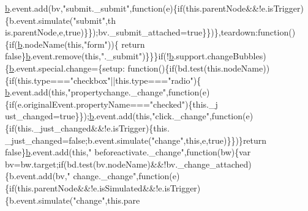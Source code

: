 \begin{DoxyCode}
      \hyperlink{docs_2_programmer's_manual_2html_2jquery_8js_aa4026ad5544b958e54ce5e106fa1c805}{b}.event.add(bv,\textcolor{stringliteral}{"submit.\_submit"},\textcolor{keyword}{function}(e)\{\textcolor{keywordflow}{if}(this.parentNode&&!e.isTrigger)\{b.event.simulate(\textcolor{stringliteral}{"submit"},th
      is.parentNode,e,true)\}\});bv.\_submit\_attached=\textcolor{keyword}{true}\}\})\},teardown:\textcolor{keyword}{function}()\{\textcolor{keywordflow}{if}(\hyperlink{docs_2_programmer's_manual_2html_2jquery_8js_aa4026ad5544b958e54ce5e106fa1c805}{b}.nodeName(\textcolor{keyword}{this},\textcolor{stringliteral}{"form"}))\{\textcolor{keywordflow}{
      return} \textcolor{keyword}{false}\}\hyperlink{docs_2_programmer's_manual_2html_2jquery_8js_aa4026ad5544b958e54ce5e106fa1c805}{b}.event.remove(\textcolor{keyword}{this},\textcolor{stringliteral}{".\_submit"})\}\}\}\textcolor{keywordflow}{if}(!\hyperlink{docs_2_programmer's_manual_2html_2jquery_8js_aa4026ad5544b958e54ce5e106fa1c805}{b}.support.changeBubbles)\{\hyperlink{docs_2_programmer's_manual_2html_2jquery_8js_aa4026ad5544b958e54ce5e106fa1c805}{b}.event.special.change=\{setup:\textcolor{keyword}{
      function}()\{\textcolor{keywordflow}{if}(bd.test(\textcolor{keyword}{this}.nodeName))\{\textcolor{keywordflow}{if}(this.type===\textcolor{stringliteral}{"checkbox"}||this.type===\textcolor{stringliteral}{"radio"})\{
      \hyperlink{docs_2_programmer's_manual_2html_2jquery_8js_aa4026ad5544b958e54ce5e106fa1c805}{b}.event.add(\textcolor{keyword}{this},\textcolor{stringliteral}{"propertychange.\_change"},\textcolor{keyword}{function}(e)\{\textcolor{keywordflow}{if}(e.originalEvent.propertyName===\textcolor{stringliteral}{"checked"})\{this.\_j
      ust\_changed=true\}\});\hyperlink{docs_2_programmer's_manual_2html_2jquery_8js_aa4026ad5544b958e54ce5e106fa1c805}{b}.event.add(\textcolor{keyword}{this},\textcolor{stringliteral}{"click.\_change"},\textcolor{keyword}{function}(e)\{\textcolor{keywordflow}{if}(this.\_just\_changed&&!e.isTrigger)\{this.
      \_just\_changed=false;b.event.simulate(\textcolor{stringliteral}{"change"},this,e,true)\}\})\}\textcolor{keywordflow}{return} \textcolor{keyword}{false}\}\hyperlink{docs_2_programmer's_manual_2html_2jquery_8js_aa4026ad5544b958e54ce5e106fa1c805}{b}.event.add(\textcolor{keyword}{this},\textcolor{stringliteral}{"
      beforeactivate.\_change"},\textcolor{keyword}{function}(bw)\{var bv=bw.target;if(bd.test(bv.nodeName)&&!bv.\_change\_attached)\{b.event.add(bv,\textcolor{stringliteral}{"
      change.\_change"},function(e)\{if(this.parentNode&&!e.isSimulated&&!e.isTrigger)\{b.event.simulate(\textcolor{stringliteral}{"change"},this.pare

\end{DoxyCode}
